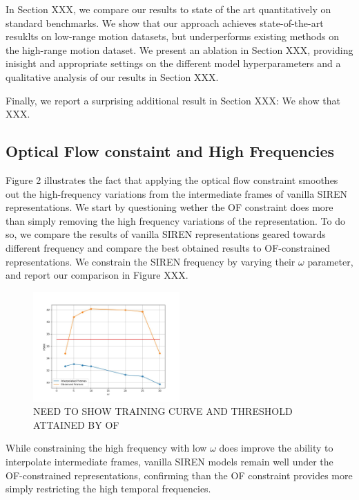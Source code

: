\documentclass{article}
\begin{document}
In Section XXX, we compare our results to state of the art quantitatively on standard benchmarks.
We show that our approach achieves state-of-the-art resuklts on low-range motion datasets, but underperforms existing methods on the high-range motion dataset.
We present an ablation in Section XXX, providing inisight and appropriate settings on the different model hyperparameters and a qualitative analysis of our results in Section XXX.

Finally, we report a surprising additional result in Section XXX:
We show that XXX.

\subsection{Optical Flow constaint and High Frequencies}

Figure 2 illustrates the fact that applying the optical flow constraint smoothes out the high-frequency variations
from the intermediate frames of vanilla SIREN representations.
We start by questioning wether the OF constraint does more than simply removing the high frequency variations of the representation.
To do so, we compare the results of vanilla SIREN representations geared towards different frequency and compare the
best obtained results to OF-constrained representations.
We constrain the SIREN frequency by varying their $\omega$ parameter,
and report our comparison in Figure XXX.

\begin{figure}[t]
\centering
\includegraphics[width=0.5\textwidth]{"omega_wo_of"}
\caption{NEED TO SHOW TRAINING CURVE AND THRESHOLD ATTAINED BY OF}
\end{figure}

While constraining the high frequency with low $\omega$ does improve the ability to interpolate intermediate frames,
vanilla SIREN models remain well under the OF-constrained representations,
confirming than the OF constraint provides more simply restricting the high temporal frequencies.
\end{document}
